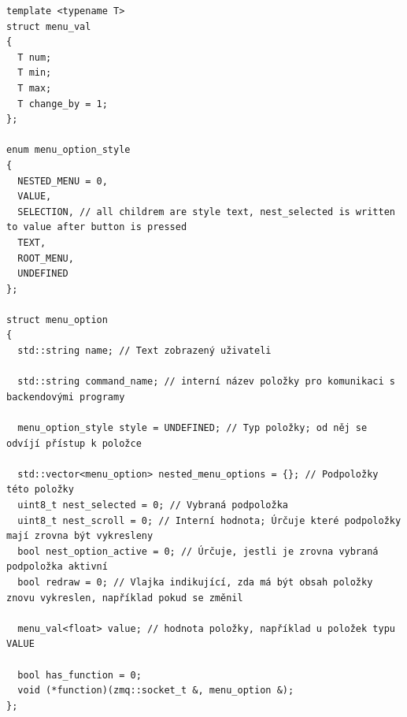 \documentclass{template/socthesis}
\newenvironment{code}{\captionsetup{type=listing}}{}
\begin{document}
\begin{code}
  \begin{verbatim}
template <typename T>
struct menu_val
{
  T num;
  T min;
  T max;
  T change_by = 1;
};

enum menu_option_style
{
  NESTED_MENU = 0,
  VALUE,
  SELECTION, // all childrem are style text, nest_selected is written to value after button is pressed
  TEXT,
  ROOT_MENU,
  UNDEFINED
};

struct menu_option
{
  std::string name; // Text zobrazený uživateli

  std::string command_name; // interní název položky pro komunikaci s backendovými programy

  menu_option_style style = UNDEFINED; // Typ položky; od něj se odvíjí přístup k položce

  std::vector<menu_option> nested_menu_options = {}; // Podpoložky této položky
  uint8_t nest_selected = 0; // Vybraná podpoložka
  uint8_t nest_scroll = 0; // Interní hodnota; Úrčuje které podpoložky mají zrovna být vykresleny
  bool nest_option_active = 0; // Úrčuje, jestli je zrovna vybraná podpoložka aktivní
  bool redraw = 0; // Vlajka indikující, zda má být obsah položky znovu vykreslen, například pokud se změnil

  menu_val<float> value; // hodnota položky, například u položek typu VALUE

  bool has_function = 0;
  void (*function)(zmq::socket_t &, menu_option &);
};
\end{verbatim}
\end{code}
\end{document}
